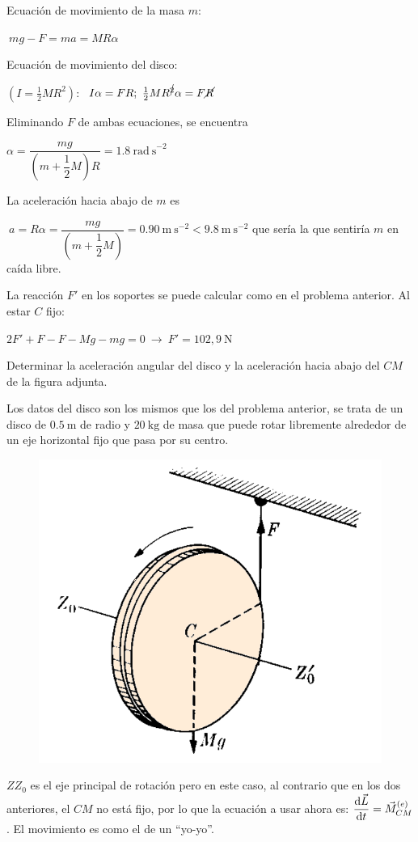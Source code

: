 Ecuación de movimiento de la masa $m$: 

$\ mg-F=ma=MR\alpha$

Ecuación de movimiento del disco:

$(I=\frac 1 2 MR^2)$: $\ I\alpha=FR; \ \frac 1 2 M R^{\cancel{2}} \alpha=F\cancel{R}$

Eliminando $F$ de ambas ecuaciones, se encuentra 

$\alpha=\dfrac{mg}{\left( m+\dfrac 1 2 M \right)R}=1.8 \ \mathrm{rad\ s}^{-2}$

La aceleración hacia abajo de $m$ es 

$\ a=R\alpha=\dfrac{mg}{\left( m+\dfrac 1 2 M \right)}=0.90 \ \mathrm{m\ s}^{-2} < 9.8 \ \mathrm{m\ s}^{-2}$ que sería la que sentiría $m$ en caída libre.

La reacción $F'$ en los soportes se puede calcular como en el problema anterior. Al estar $C$ fijo:

$2F'+F-F-Mg-mg=0 \ \to \ F'=102,9\ \mathrm{N}$

\begin{prob}
\begin{multicols}{2}
Determinar la aceleración angular del disco y la aceleración hacia abajo del $CM$ de la figura adjunta.

Los datos del disco son los mismos que los del problema anterior, se trata de un disco de $0.5\ \mathrm{m}$  de radio y $20\ \mathrm{kg}$ de masa	que puede rotar libremente alrededor de un eje horizontal fijo que pasa por su centro.
\begin{figure}[H]
	\centering
	\includegraphics[width=.35\textwidth]{imagenes/imagenes16/T16IM13.png}
\end{figure}	
\end{multicols}
\end{prob}

$ZZ_0$ es el eje principal de rotación pero en este caso, al contrario que en los dos anteriores, el $CM$ no está fijo, por lo que la ecuación a usar ahora es:
$\displaystyle \dv{\vec L}{t}=\vec M^{(e)}_{CM}$. 
El movimiento es como el de un ``yo-yo''.

